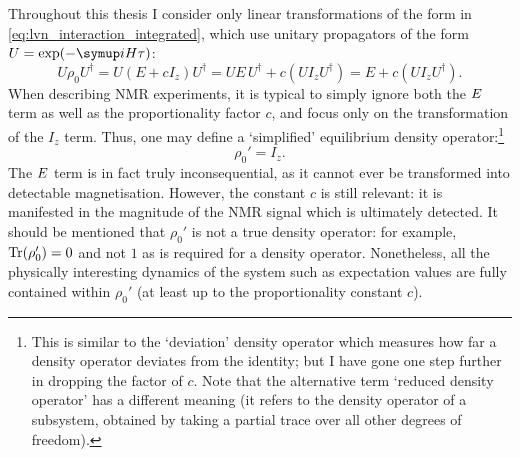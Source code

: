 Throughout this thesis I consider only linear transformations of the form in \cref{eq:lvn_interaction_integrated}, which use unitary propagators of the form $U = \exp(-\mi H\tau)$:
\begin{equation}
    \label{eq:unitary_rho0}
    U\rho_0 U^\dagger = U(E + cI_z)U^\dagger = UE\,U^\dagger + c(UI_zU^\dagger) = E + c(UI_zU^\dagger).
\end{equation}
When describing NMR experiments, it is typical to simply ignore both the $E\/$ term as well as the proportionality factor $c$, and focus only on the transformation of the $I_z$ term.
Thus, one may define a `simplified' equilibrium density operator:\footnote{This is similar to the `deviation' density operator\autocite{Chuang1998PRSLA,Jones2011PNMRS} which measures how far a density operator deviates from the identity; but I have gone one step further in dropping the factor of $c$. Note that the alternative term `reduced density operator' has a different meaning (it refers to the density operator of a subsystem, obtained by taking a partial trace over all other degrees of freedom).}
\begin{equation}
    \label{eq:rho0_simplified}
    \rho_0' = I_z.
\end{equation}
The $E\/$ term is in fact truly inconsequential, as it cannot ever be transformed into detectable magnetisation.
However, the constant $c$ is still relevant: it is manifested in the magnitude of the NMR signal which is ultimately detected.
It should be mentioned that $\rho_0'$ is not a true density operator: for example, $\operatorname{Tr}(\rho_0') = 0$ and not $1$ as is required for a density operator.
Nonetheless, all the physically interesting dynamics of the system such as expectation values are fully contained within $\rho_0'$ (at least up to the proportionality constant $c$).
